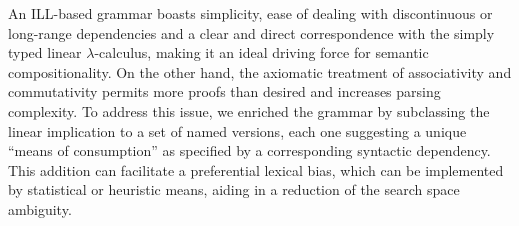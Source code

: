 An ILL-based grammar boasts simplicity, ease of dealing with discontinuous or long-range dependencies and a clear and direct correspondence with the simply typed linear $\lambda$-calculus, making it an ideal driving force for semantic compositionality.
On the other hand, the axiomatic treatment of associativity and commutativity permits more proofs than desired and increases parsing complexity.
To address this issue, we enriched the grammar by subclassing the linear implication to a set of named versions, each one suggesting a unique ``means of consumption'' as specified by a corresponding syntactic dependency. 
This addition can facilitate a preferential lexical bias, which can be implemented by statistical or heuristic means, aiding in a reduction of the search space ambiguity.
